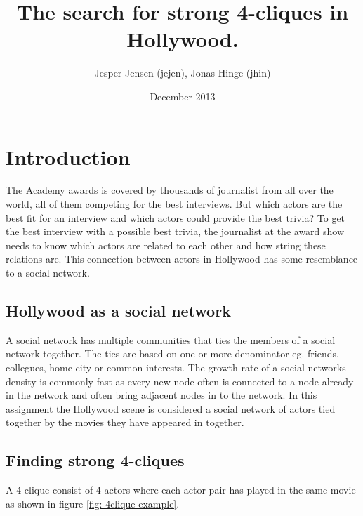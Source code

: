 \documentclass{article}
\title{The search for strong 4-cliques in Hollywood.}
\author{Jesper Jensen (jejen), Jonas Hinge (jhin)}
\date{December 2013}
\begin{document}
\maketitle

\section{Introduction}
The Academy awards is covered by thousands of journalist from all over the world, all of them competing for the best interviews. But which actors are the best fit for an interview and which actors could provide the best trivia?
To get the best interview with a possible best trivia, the journalist at the award show needs to know which actors are related to each other and how string these relations are. This connection between actors in Hollywood has some resemblance to a social network.

\subsection{Hollywood as a social network}
A social network has multiple communities that ties the members of a social network together. The ties are based on one or more denominator eg. friends, collegues, home city or common interests.
The growth rate of a social networks density is commonly fast as every new node often is connected to a node already in the network and often bring adjacent nodes in to the network. In this assignment the Hollywood scene is considered a social network of actors tied together by the movies they have appeared in together.

\subsection{Finding strong 4-cliques}
A 4-clique consist of 4 actors where each actor-pair has played in the same movie as shown in figure \ref{fig: 4clique example}.
\end{document}
